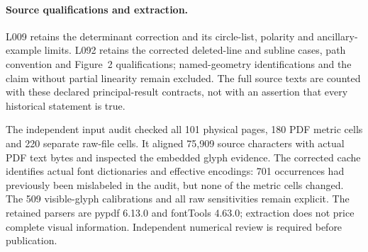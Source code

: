 \documentclass[11pt,a4paper]{article}
\begin{document}
\paragraph{Source qualifications and extraction.}
L009 retains the determinant correction and its circle-list, polarity and
ancillary-example limits. L092 retains the corrected deleted-line and
subline cases, path convention and Figure~2 qualifications; named-geometry
identifications and the claim without partial linearity remain excluded.
The full source texts are counted with these declared principal-result
contracts, not with an assertion that every historical statement is true.

The independent input audit checked all 101 physical pages, 180 PDF metric
cells and 220 separate raw-file cells. It aligned 75,909 source characters
with actual PDF text bytes and inspected the embedded glyph evidence.
The corrected cache identifies actual font dictionaries and effective
encodings: 701 occurrences had previously been mislabeled in the audit,
but none of the metric cells changed. The 509 visible-glyph calibrations
and all raw sensitivities remain explicit. The retained parsers are
pypdf 6.13.0 and fontTools 4.63.0; extraction does not price complete visual
information. Independent numerical review is required before publication.
\end{document}
